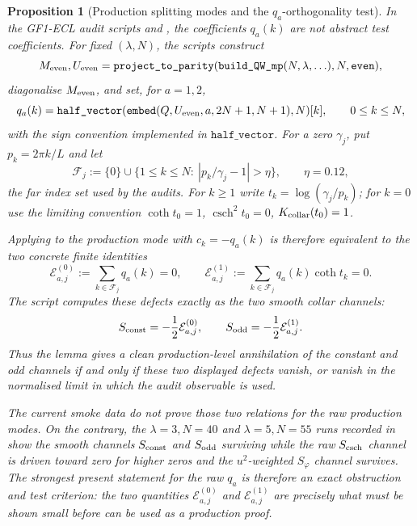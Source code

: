 \documentclass[11pt,a4paper]{article}
\newtheorem{proposition}[proposition]{Proposition}
\theoremstyle{remark}
\theoremstyle{plain}
\begin{document}
\begin{proposition}[Production splitting modes and the \(q_a\)-orthogonality test]
\label{prop:gf1-production-q-orthogonality-status}
In the GF1-ECL audit scripts
 and
, the coefficients
\(q_a(k)\) are not abstract test coefficients.  For fixed
\((\lambda,N)\), the scripts construct
\[
  M_{\rm even},U_{\rm even}
  =\texttt{project\_to\_parity}(
      \texttt{build\_QW\_mp}(N,\lambda,\ldots),N,\texttt{even}),
\]
diagonalise \(M_{\rm even}\), and set, for \(a=1,2\),
\[
  q_a(k)
  =
  \texttt{half\_vector}(
    \texttt{embed}(Q,U_{\rm even},a,2N+1,N+1),N)[k],
  \qquad 0\leq k\leq N,
\]
with the sign convention implemented in \(\texttt{half\_vector}\).
For a zero \(\gamma_j\), put \(p_k=2\pi k/L\) and let
\[
  \mathcal{F}_j
  :=\{0\}\cup\{1\leq k\leq N:\ |p_k/\gamma_j-1|>\eta\},
  \qquad \eta=0.12,
\]
the far index set used by the audits.  For \(k\geq1\) write
\(t_k=\log(\gamma_j/p_k)\); for \(k=0\) use the limiting convention
\(\coth t_0=1\), \(\operatorname{csch}^2t_0=0\), \(K_{\rm collar}(t_0)=1\).

Applying  to the production
mode with \(c_k=-q_a(k)\) is therefore equivalent to the two concrete
finite identities
\[
  \mathcal{E}^{(0)}_{a,j}
  :=\sum_{k\in\mathcal{F}_j}q_a(k)=0,
  \qquad
  \mathcal{E}^{(1)}_{a,j}
  :=\sum_{k\in\mathcal{F}_j}q_a(k)\coth t_k=0 .
\]
The script computes these defects exactly as the two smooth collar
channels:
\[
  S_{\rm const}=-\frac12\mathcal{E}^{(0)}_{a,j},
  \qquad
  S_{\rm odd}=-\frac12\mathcal{E}^{(1)}_{a,j}.
\]
Thus the lemma gives a clean production-level annihilation of the
constant and odd channels if and only if these two displayed defects
vanish, or vanish in the normalised limit in which the audit observable
is used.

The current smoke data do not prove those two relations for the raw
production modes.  On the contrary, the \(\lambda=3,N=40\) and
\(\lambda=5,N=55\) runs recorded in
show the smooth channels \(S_{\rm const}\) and \(S_{\rm odd}\) surviving
while the raw \(S_{\rm csch}\) channel is driven toward zero for higher
zeros and the \(u^2\)-weighted \(S_\varphi\) channel survives.  The
strongest present statement for the raw \(q_a\) is therefore an exact
obstruction and test criterion: the two quantities
\(\mathcal{E}^{(0)}_{a,j}\) and \(\mathcal{E}^{(1)}_{a,j}\) are precisely
what must be shown small before 
can be used as a production proof.
\end{proposition}
\end{document}
